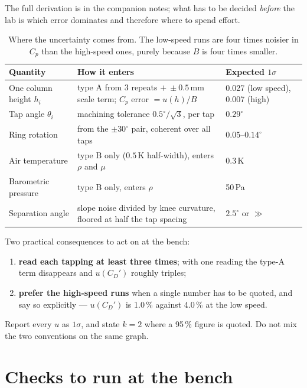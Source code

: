 \documentclass[11pt,a4paper]{article}
\newcommand{\Cp}{\ensuremath{C_p}}
\newcommand{\CD}{\ensuremath{C_D}}
\begin{document}
The full derivation is in the companion notes; what has to be decided \emph{before} the lab is
which error dominates and therefore where to spend effort.

\begin{table}[H]
\centering\small
\begin{tabularx}{\textwidth}{@{}lXl@{}}
\toprule
Quantity & How it enters & Expected $1\sigma$ \\
\midrule
One column height $h_i$ & type A from 3 repeats $+\ \pm0.5$\,mm scale term; $\Cp$ error $=u(h)/B$ &
0.027 (low speed), 0.007 (high) \\
Tap angle $\theta_i$ & machining tolerance $0.5^\circ/\sqrt3$, per tap & $0.29^\circ$ \\
Ring rotation & from the $\pm30^\circ$ pair, coherent over all taps & $0.05$--$0.14^\circ$ \\
Air temperature & type B only ($0.5$\,K half-width), enters $\rho$ and $\mu$ & $0.3$\,K \\
Barometric pressure & type B only, enters $\rho$ & 50\,Pa \\
Separation angle & slope noise divided by knee curvature, floored at half the tap spacing & $2.5^\circ$ or $\gg$ \\
\bottomrule
\end{tabularx}
\caption{Where the uncertainty comes from. The low-speed runs are four times noisier in \Cp{}
than the high-speed ones, purely because $B$ is four times smaller.}
\end{table}

Two practical consequences to act on at the bench:
\begin{enumerate}[leftmargin=1.4em,itemsep=1pt,topsep=2pt]
\item \textbf{read each tapping at least three times}; with one reading the type-A term
disappears and $u(\CD')$ roughly triples;
\item \textbf{prefer the high-speed runs} when a single number has to be quoted, and say
so explicitly --- $u(\CD')$ is 1.0\,\% against 4.0\,\% at the low speed.
\end{enumerate}

Report every $u$ as $1\sigma$, and state $k=2$ where a 95\,\% figure is quoted. Do not mix the
two conventions on the same graph.

\section{Checks to run at the bench}
\end{document}

